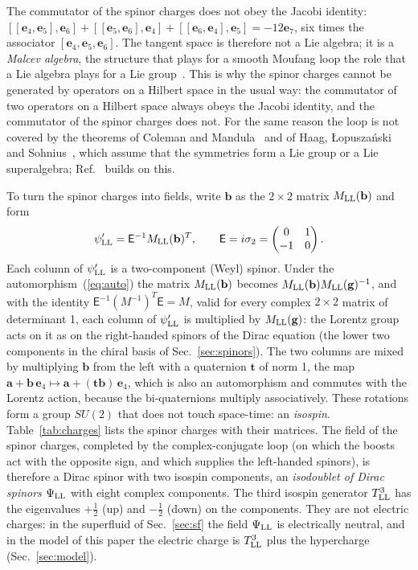\documentclass[aps,prd,twocolumn,superscriptaddress,nofootinbib,floatfix,longbibliography]{revtex4-2}
\newcommand{\LL}{{\rm LL}}
\newcommand{\e}[1]{\mathbf e_{#1}}
\begin{document}
The commutator of the spinor charges does not obey the Jacobi identity: $[[\e4,\e5],\e6]+[[\e5,\e6],\e4]+[[\e6,\e4],\e5]
=-12\e{7}$, six times the associator $[\e4,\e5,\e6]$. The tangent space is therefore not a Lie algebra;
it is a \emph{Malcev algebra}, the structure that plays for a smooth Moufang loop the role that a Lie algebra plays for
a Lie group~\cite{Malcev1955}. This is why the spinor charges cannot be generated by operators on a Hilbert space in the
usual way: the commutator of two operators on a Hilbert space always obeys the Jacobi identity, and the commutator of the
spinor charges does not. For the same reason the loop is not covered by the theorems of Coleman and
Mandula~\cite{ColemanMandula1967} and of Haag, \L{}opusza\'nski and Sohnius~\cite{HLS1975}, which assume that the
symmetries form a Lie group or a Lie superalgebra; Ref.~\cite{Nash2026} builds on this.

To turn the spinor charges into fields, write $\mathbf b$ as the $2\times2$ matrix $M_\LL(\mathbf b)$ and form
\begin{equation}
\psi'_\LL=\mathsf E^{-1}M_\LL(\mathbf b)^T,\qquad \mathsf E=i\sigma_2=\begin{pmatrix}0&1\\-1&0\end{pmatrix}.
\label{eq:psiprime}
\end{equation}
Each column of $\psi'_\LL$ is a two-component (Weyl) spinor. Under the automorphism~(\ref{eq:auto}) the matrix
$M_\LL(\mathbf b)$ becomes $M_\LL(\mathbf b)M_\LL(\mathbf g)^{-1}$, and with the identity $\mathsf E^{-1}(M^{-1})^T\mathsf
E=M$, valid for every complex $2\times2$ matrix of determinant 1, each column of $\psi'_\LL$ is multiplied by
$M_\LL(\mathbf g)$: the Lorentz group acts on it as on the right-handed spinors of the Dirac equation (the lower two
components in the chiral basis of Sec.~\ref{sec:spinors}). The two columns are mixed by multiplying $\mathbf b$ from the
left with a quaternion $\mathbf t$ of norm 1, the map $\mathbf a+\mathbf b\,\e4\mapsto\mathbf a+(\mathbf t\mathbf
b)\,\e4$, which is also an automorphism and commutes with the Lorentz action, because the bi-quaternions multiply
associatively. These rotations form a group $SU(2)$ that does not touch space-time: an \emph{isospin}.
Table~\ref{tab:charges} lists the spinor charges with their matrices. The field of the spinor charges, completed by the
complex-conjugate loop (on which the boosts act with the opposite sign, and which supplies the left-handed spinors), is
therefore a Dirac spinor with two isospin components, an \emph{isodoublet of Dirac spinors} $\Psi_\LL$ with eight complex
components. The third isospin generator $T^3_\LL$ has the eigenvalues $+\frac12$ (up) and $-\frac12$ (down) on the
components. They are not electric charges: in the superfluid of Sec.~\ref{sec:sf} the field $\Psi_\LL$ is electrically
neutral, and in the model of this paper the electric charge is $T^3_\LL$ plus the hypercharge (Sec.~\ref{sec:model}).
\end{document}
